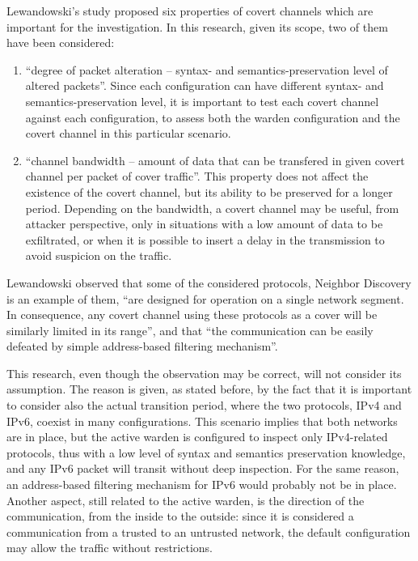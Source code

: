 \documentclass[12pt]{article}
\begin{document}
Lewandowski's study proposed six properties of covert channels which are important for the investigation. In this research, given its scope, two of them have been considered:
\vspace{-15pt}
\begin{enumerate}[noitemsep,topsep=0pt,partopsep=0pt]
 \item ``degree of packet alteration – syntax- and semantics-preservation level of altered packets''. Since each configuration can have different syntax- and semantics-preservation level, it is important to test each covert channel against each configuration, to assess both the warden configuration and the covert channel in this particular scenario\cite{lewandowski}.
 \item ``channel bandwidth – amount of data that can be transfered in given covert channel per packet of cover traffic''. This property does not affect the existence of the covert channel, but its ability to be preserved for a longer period. Depending on the bandwidth, a covert channel may be useful, from attacker perspective, only in situations with a low amount of data to be exfiltrated, or when it is possible to insert a delay in the transmission to avoid suspicion on the traffic\cite{lewandowski}.
\end{enumerate}

Lewandowski observed that some of the considered protocols, Neighbor Discovery is an example of them, ``are designed for operation on a single network segment. In consequence, any covert channel using these protocols as a cover will be similarly limited in its range'', and that ``the communication can be easily defeated by simple address-based filtering mechanism''\cite{lewandowski}.

This research, even though the observation may be correct, will not consider its assumption. The reason is given, as stated before, by the fact that it is important to consider also the actual transition period, where the two protocols, IPv4 and IPv6, coexist in many configurations. This scenario implies that both networks are in place, but the active warden is configured to inspect only IPv4-related protocols, thus with a low level of syntax and semantics preservation knowledge, and any IPv6 packet will transit without deep inspection. For the same reason, an address-based filtering mechanism for IPv6 would probably not be in place. Another aspect, still related to the active warden, is the direction of the communication, from the inside to the outside: since it is considered a communication from a trusted to an untrusted network, the default configuration may allow the traffic without restrictions.
\end{document}

